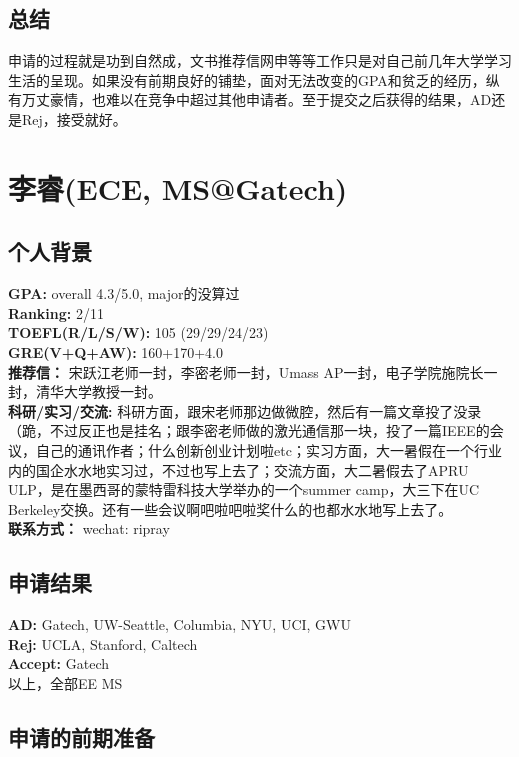 \documentclass[a4paper,UTF8]{book}
\begin{document}
    \subsection*{总结}
        申请的过程就是功到自然成，文书推荐信网申等等工作只是对自己前几年大学学习生活的呈现。如果没有前期良好的铺垫，面对无法改变的GPA和贫乏的经历，纵有万丈豪情，也难以在竞争中超过其他申请者。至于提交之后获得的结果，AD还是Rej，接受就好。

\clearpage
\section{李睿(ECE, MS@Gatech)}
    \subsection*{个人背景}
        \textbf{GPA:} overall 4.3/5.0, major的没算过\\
        \textbf{Ranking:} 2/11\\
        \textbf{TOEFL(R/L/S/W): } 105 (29/29/24/23)\\
        \textbf{GRE(V+Q+AW):} 160+170+4.0\\
        \textbf{推荐信：} 宋跃江老师一封，李密老师一封，Umass AP一封，电子学院施院长一封，清华大学教授一封。\\
        \textbf{科研/实习/交流:} 科研方面，跟宋老师那边做微腔，然后有一篇文章投了没录（跪，不过反正也是挂名；跟李密老师做的激光通信那一块，投了一篇IEEE的会议，自己的通讯作者；什么创新创业计划啦etc；实习方面，大一暑假在一个行业内的国企水水地实习过，不过也写上去了；交流方面，大二暑假去了APRU ULP，是在墨西哥的蒙特雷科技大学举办的一个summer camp，大三下在UC Berkeley交换。还有一些会议啊吧啦吧啦奖什么的也都水水地写上去了。\\ 
        \textbf{联系方式：} wechat: ripray

    \subsection*{申请结果}
        \textbf{AD:} Gatech, UW-Seattle, Columbia, NYU, UCI, GWU\\
        \textbf{Rej:} UCLA, Stanford, Caltech\\
        \textbf{Accept:} Gatech\\
        以上，全部EE MS

    \subsection*{申请的前期准备}
\end{document}
